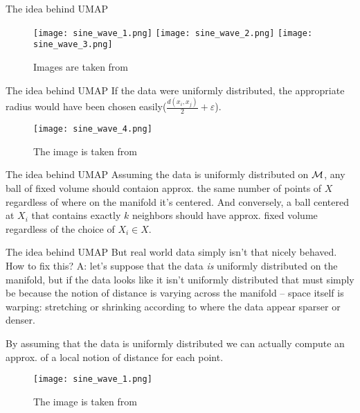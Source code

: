 \documentclass{beamer}
\theoremstyle{named}
\begin{document}
\begin{frame}{The idea behind UMAP}
	\begin{figure}[htp]
		\centering
		\texttt{[image: sine\_wave\_1.png]}\hfill
		\texttt{[image: sine\_wave\_2.png]}\hfill
		\texttt{[image: sine\_wave\_3.png]}
		\caption{Images are taken from \cite{docs}}
	\end{figure}
\end{frame}

\begin{frame}{The idea behind UMAP}
	If the data were uniformly distributed, the appropriate radius would have been chosen easily($ \frac{d(x_i, x_j)}{2} + \varepsilon $).
	\begin{figure}[htp]
		\centering
		\texttt{[image: sine\_wave\_4.png]}
		\caption{The image is taken from \cite{docs}}
	\end{figure}
\end{frame}

\begin{frame}{The idea behind UMAP}
	Assuming the data is uniformly distributed on $\cal{M}$, any ball of fixed volume should contaion approx. the same number of points of $X$ regardless of where on the manifold it's centered. And conversely, a ball centered at $X_i$ that contains exactly $k$ neighbors should have approx. fixed volume regardless of the choice of $X_i \in X$. 
\end{frame}

\begin{frame}{The idea behind UMAP}
	But real world data simply isn’t that nicely behaved. How to fix this?
	\newline
	\newline
	A: let's suppose that the data {\it is} uniformly distributed on the manifold, but if the data looks like it isn’t uniformly distributed that must simply be because the notion of distance is varying across the manifold – space itself is warping: stretching or shrinking according to where the data appear sparser or denser.
	
	By assuming that the data is uniformly distributed we can actually compute an approx. of a local notion of distance for each point.
\end{frame}

\begin{frame}
		\begin{figure}[htp]
		\centering
		\texttt{[image: sine\_wave\_1.png]}
		\caption{The image is taken from \cite{docs}}
	\end{figure}
\end{frame}
\end{document}
